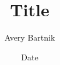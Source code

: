 \documentclass[12pt]{article}
\begin{document}
\title{Title}
\author{Avery Bartnik}
\date{Date}
\maketitle
\end{document}
